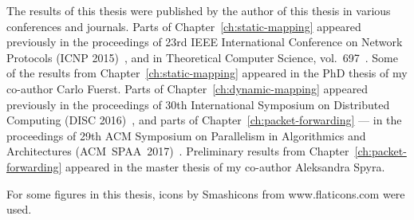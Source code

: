 The results of this thesis were published by the author of this thesis in various conferences and journals.
Parts of Chapter~\ref{ch:static-mapping} appeared previously in the proceedings of 23rd IEEE International Conference on Network Protocols (ICNP 2015)~\cite{my-icnp},
and in Theoretical Computer Science, vol.~697~\cite{my-tcs}.
Some of the results from Chapter~\ref{ch:static-mapping} appeared in the PhD thesis of my co-author Carlo Fuerst.
Parts of Chapter~\ref{ch:dynamic-mapping} appeared previously in the proceedings of 30th International Symposium on Distributed Computing (DISC 2016)~\cite{my-disc}, and parts of Chapter~\ref{ch:packet-forwarding} --- in the proceedings of 29th ACM Symposium on Parallelism in Algorithmics and Architectures (ACM~SPAA~2017)~\cite{my-spaa}.
Preliminary results from Chapter~\ref{ch:packet-forwarding} appeared in the master thesis of my co-author Aleksandra Spyra.

For some figures in this thesis, icons by Smashicons from www.flaticons.com were used.